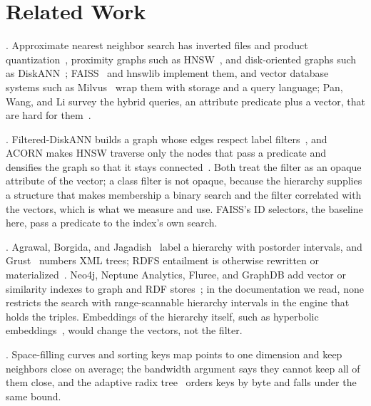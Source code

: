 \section{Related Work}
\label{sec-related}

.
Approximate nearest neighbor search has inverted files and product
quantization~\cite{jegou2011}, proximity graphs such as HNSW~\cite{malkov2020}, and
disk-oriented graphs such as DiskANN~\cite{subramanya2019}; FAISS~\cite{johnson2021,douze2024}
and hnswlib implement them, and vector database systems such as Milvus~\cite{wang2021milvus}
wrap them with storage and a query language; Pan, Wang, and Li survey the hybrid
queries, an attribute predicate plus a vector, that are hard for them~\cite{pan2024}.

.
Filtered-DiskANN builds a graph whose edges respect label filters~\cite{gollapudi2023},
and ACORN makes HNSW traverse only the nodes that pass a predicate and densifies the
graph so that it stays connected~\cite{patel2024}.
Both treat the filter as an opaque attribute of the vector; a class filter is not
opaque, because the hierarchy supplies a structure that makes membership a binary search
and the filter correlated with the vectors, which is what we measure and use.
FAISS's ID selectors, the baseline here, pass a predicate to the index's own search.

.
Agrawal, Borgida, and Jagadish~\cite{agrawal1989} label a hierarchy with postorder
intervals, and Grust~\cite{grust2002} numbers XML trees; RDFS entailment is otherwise
rewritten or materialized~\cite{rdfox}.
Neo4j, Neptune Analytics, Fluree, and GraphDB add vector or similarity indexes to graph
and RDF stores~\cite{neo4jvec,neptunevec,fluree,graphdbsim}; in the documentation we
read, none restricts the search with range-scannable hierarchy intervals in the engine
that holds the triples.
Embeddings of the hierarchy itself, such as hyperbolic embeddings~\cite{nickel2017}, would
change the vectors, not the filter.

.
Space-filling curves and sorting keys map points to one dimension and keep neighbors
close on average; the bandwidth argument says they cannot keep all of them close, and the
adaptive radix tree~\cite{leis2013} orders keys by byte and falls under the same bound.
